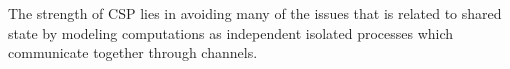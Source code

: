 The strength of \ac{CSP} lies in avoiding many of the issues that is related to shared state by modeling computations as independent isolated processes which communicate together through channels. 

\worksheetend
